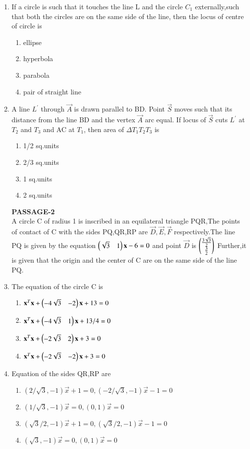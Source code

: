 \begin{enumerate}[label=\arabic*.,ref=\thesubsection.\theenumi]
\item If a circle is such that it touches the line L and the circle $C_1$ externally,such that both the circles are on the same side of the line, then the locus of centre of circle is
\begin{enumerate}
\item ellipse 
\item hyperbola
\item parabola
\item  pair of straight line
\end{enumerate}
    
\item A line $L^{'}$ through $\vec{A}$ is drawn parallel to BD. Point $\vec{S}$ moves such that its distance from the line BD and the vertex $\vec{A}$ arc equal. If locus of $\vec{S}$ cuts $L^{'}$ at $T_2$ and $T_3$ and AC at $T_1$, then area of  $\Delta T_1T_2T_3$ is
\begin{enumerate}
\item 1/2 sq.units
\item 2/3 sq.units
\item 1 sq.units
\item 2 sq.units
\end{enumerate} 

\textbf{PASSAGE-2}\\
A circle C of radius 1 is inscribed in an equilateral triangle PQR,The points of contact of C with the sides PQ,QR,RP are $\vec{D},\vec{E},\vec{F}$ respectively.The line PQ is given by the equation  $\begin{pmatrix}\sqrt{3}&1\end{pmatrix}\mathbf{x}-6=0$  and point $\vec{D}$ is $\begin{pmatrix}\frac{3\sqrt{3}}{2} \\ \frac{3}{2}\end{pmatrix}$ Further,it is given that the origin and the center of C are on the same side of the line PQ.\\

\item The equation of the circle C is 
\begin{enumerate}
\item $\mathbf{x}^T\mathbf{x}+\begin{pmatrix}-4\sqrt{3}&-2\end{pmatrix}\mathbf{x}+13=0$
\item $\mathbf{x}^T\mathbf{x}+\begin{pmatrix}-4\sqrt{3}&1\end{pmatrix}\mathbf{x}+13/4=0$
\item $\mathbf{x}^T\mathbf{x}+\begin{pmatrix}-2\sqrt{3}&2\end{pmatrix}\mathbf{x}+3=0$
\item $\mathbf{x}^T\mathbf{x}+\begin{pmatrix}-2\sqrt{3}&-2\end{pmatrix}\mathbf{x}+3=0$
\end{enumerate}
        
\item Equation of the sides QR,RP are
\begin{enumerate}
\item $(2/\sqrt{3},-1)\vec x+1=0,(-2/\sqrt{3},-1)\vec x-1=0$
\item $(1/\sqrt{3},-1)\vec x=0,(0,1)\vec x=0$
\item $(\sqrt{3}/2,-1)\vec x+1=0,(\sqrt{3}/2,-1)\vec x-1=0$
\item $(\sqrt{3},-1)\vec x=0,(0,1)\vec x=0$ 
\end{enumerate}


\end{enumerate}
